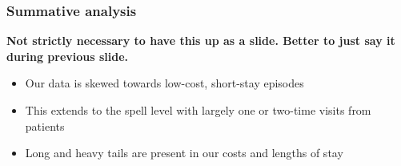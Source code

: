 \graphicspath{{./img/general/}}

\begin{frame}
    \frametitle{Summative analysis}
    \textbf{Not strictly necessary to have this up as a slide. Better to just
    say it during previous slide.}
    \begin{itemize}
        \pause%
        \item Our data is skewed towards low-cost, short-stay episodes
        \pause%
        \item This extends to the spell level with largely one or two-time
            visits from patients
        \pause%
        \item Long and heavy tails are present in our costs and lengths of stay
    \end{itemize}
\end{frame}



